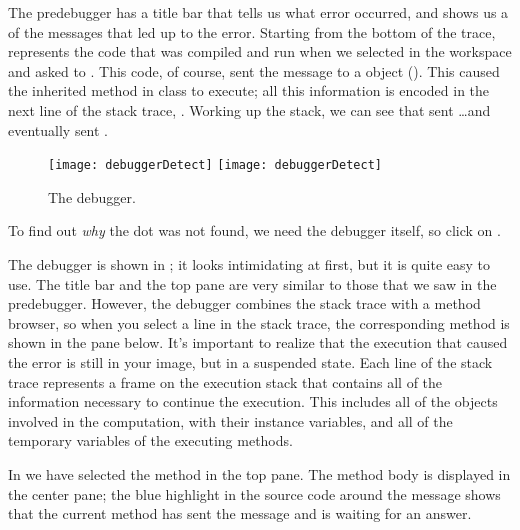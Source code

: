 \documentclass[a4paper,10pt,twoside]{book}
\begin{document}
The predebugger has a title bar that tells us what error occurred, and shows us a  of the messages that led up to the error.
Starting from the bottom of the trace,  represents the code that was compiled and run when we selected  in the workspace and asked \sq to .
This code, of course, sent the message  to a  object ().
This caused the inherited  method in class  to execute; all this information is encoded in the next line of the stack trace, .
Working up the stack, we can see that  sent \ldots and eventually  sent .

\begin{figure}[btp]
	\begin{center}
	\ifluluelse
		{\texttt{[image: debuggerDetect]}}
		{\texttt{[image: debuggerDetect]}}
	\end{center}
	\caption{The debugger.}
	\label{fig:debuggerDetect}
\end{figure}

To find out \emph{why} the dot was not found, we need the debugger itself, so click on .


The debugger is shown in ; it looks intimidating at first, but it is quite easy to use.
The title bar and the top pane are very similar to those that we saw in the predebugger.
However, the debugger combines the stack trace with a method browser, so when you select a line in the stack trace, the corresponding method is shown in the pane below.
It's important to realize that the execution that caused the error is still in your image, but in a suspended state.
Each line of the stack trace represents a frame on the execution stack that contains all of the information necessary to continue the execution.
This includes all of the objects involved in the computation, with their instance variables, and all of the temporary variables of the executing methods.

In  we have selected the  method in the top pane.
The method body is displayed in the center pane; the blue highlight in the source code around the message  shows that the current method has sent the message  and is waiting for an answer.
\end{document}
